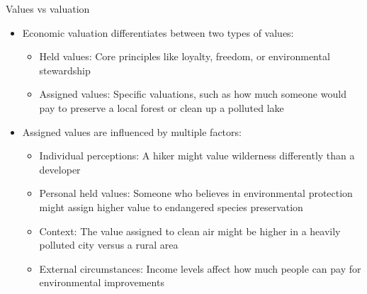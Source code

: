 \documentclass[
  ignorenonframetext,
]{beamer}
\providecommand{\tightlist}{%
  \setlength{\itemsep}{0pt}\setlength{\parskip}{0pt}}\usepackage{longtable,booktabs,array}
\begin{document}
\begin{frame}{Values vs valuation}
\label{values-vs-valuation}
\begin{itemize}
\tightlist
\item
  Economic valuation differentiates between two types of values:

  \begin{itemize}
  \tightlist
  \item
    Held values: Core principles like loyalty, freedom, or environmental
    stewardship
  \item
    Assigned values: Specific valuations, such as how much someone would
    pay to preserve a local forest or clean up a polluted lake
  \end{itemize}
\item
  Assigned values are influenced by multiple factors:

  \begin{itemize}
  \tightlist
  \item
    Individual perceptions: A hiker might value wilderness differently
    than a developer
  \item
    Personal held values: Someone who believes in environmental
    protection might assign higher value to endangered species
    preservation
  \item
    Context: The value assigned to clean air might be higher in a
    heavily polluted city versus a rural area
  \item
    External circumstances: Income levels affect how much people can pay
    for environmental improvements
  \end{itemize}
\end{itemize}
\end{frame}
\end{document}
